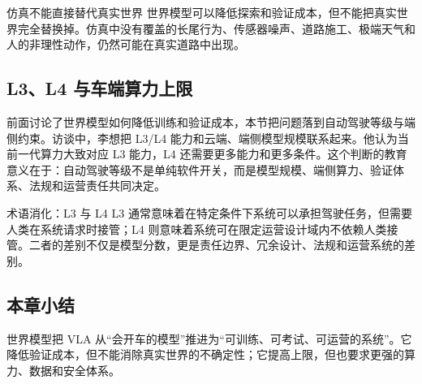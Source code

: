 \begin{warningbox}{仿真不能直接替代真实世界}
世界模型可以降低探索和验证成本，但不能把真实世界完全替换掉。仿真中没有覆盖的长尾行为、传感器噪声、道路施工、极端天气和人的非理性动作，仍然可能在真实道路中出现。
\end{warningbox}

\subsection{L3、L4 与车端算力上限}

前面讨论了世界模型如何降低训练和验证成本，本节把问题落到自动驾驶等级与端侧约束。访谈中，李想把 L3/L4 能力和云端、端侧模型规模联系起来。他认为当前一代算力大致对应 L3 能力，L4 还需要更多能力和更多条件。这个判断的教育意义在于：自动驾驶等级不是单纯软件开关，而是模型规模、端侧算力、验证体系、法规和运营责任共同决定。

\begin{knowledgebox}{术语消化：L3 与 L4}
L3 通常意味着在特定条件下系统可以承担驾驶任务，但需要人类在系统请求时接管；L4 则意味着系统可在限定运营设计域内不依赖人类接管。二者的差别不仅是模型分数，更是责任边界、冗余设计、法规和运营系统的差别。
\end{knowledgebox}

\subsection{本章小结}

世界模型把 VLA 从“会开车的模型”推进为“可训练、可考试、可运营的系统”。它降低验证成本，但不能消除真实世界的不确定性；它提高上限，但也要求更强的算力、数据和安全体系。

